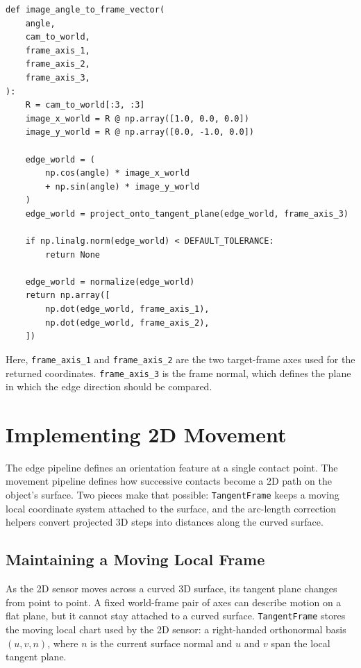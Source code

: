 \documentclass{article}
\begin{document}
\begin{verbatim}
def image_angle_to_frame_vector(
    angle,
    cam_to_world,
    frame_axis_1,
    frame_axis_2,
    frame_axis_3,
):
    R = cam_to_world[:3, :3]
    image_x_world = R @ np.array([1.0, 0.0, 0.0])
    image_y_world = R @ np.array([0.0, -1.0, 0.0])

    edge_world = (
        np.cos(angle) * image_x_world
        + np.sin(angle) * image_y_world
    )
    edge_world = project_onto_tangent_plane(edge_world, frame_axis_3)

    if np.linalg.norm(edge_world) < DEFAULT_TOLERANCE:
        return None

    edge_world = normalize(edge_world)
    return np.array([
        np.dot(edge_world, frame_axis_1),
        np.dot(edge_world, frame_axis_2),
    ])
\end{verbatim}
Here, \texttt{frame\_axis\_1} and \texttt{frame\_axis\_2} are the two target-frame axes used for the returned coordinates.
\texttt{frame\_axis\_3} is the frame normal, which defines the plane in which the edge direction should be compared.

\section{Implementing 2D Movement}

The edge pipeline defines an orientation feature at a single contact point.
The movement pipeline defines how successive contacts become a 2D path on the object's surface.
Two pieces make that possible: \texttt{TangentFrame} keeps a moving local coordinate system attached to the surface, and the arc-length correction helpers convert projected 3D steps into distances along the curved surface.

\subsection{Maintaining a Moving Local Frame}
\label{sec:tangent_frame}

As the 2D sensor moves across a curved 3D surface, its tangent plane changes from point to point.
A fixed world-frame pair of axes can describe motion on a flat plane, but it cannot stay attached to a curved surface.
\texttt{TangentFrame} stores the moving local chart used by the 2D sensor: a right-handed orthonormal basis $(u, v, n)$, where $n$ is the current surface normal and $u$ and $v$ span the local tangent plane.
\end{document}
